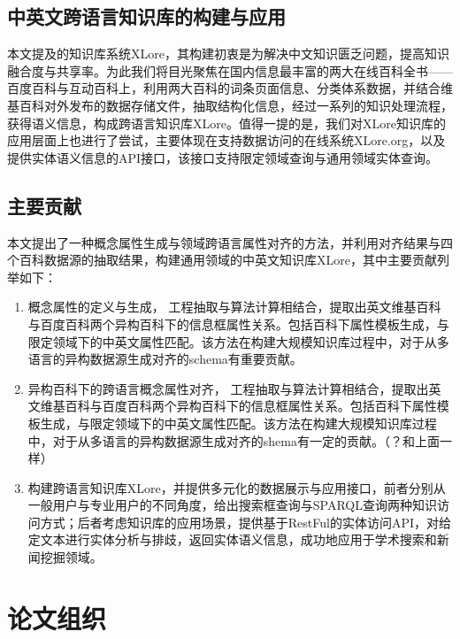 
\subsection{中英文跨语言知识库的构建与应用}
本文提及的知识库系统XLore，其构建初衷是为解决中文知识匮乏问题，提高知识融合度与共享率。为此我们将目光聚焦在国内信息最丰富的两大在线百科全书——百度百科与互动百科上，利用两大百科的词条页面信息、分类体系数据，并结合维基百科对外发布的数据存储文件，抽取结构化信息，经过一系列的知识处理流程，获得语义信息，构成跨语言知识库XLore。值得一提的是，我们对XLore知识库的应用层面上也进行了尝试，主要体现在支持数据访问的在线系统XLore.org，以及提供实体语义信息的API接口，该接口支持限定领域查询与通用领域实体查询。

\subsection{主要贡献}
本文提出了一种概念属性生成与领域跨语言属性对齐的方法，并利用对齐结果与四个百科数据源的抽取结果，构建通用领域的中英文知识库XLore，其中主要贡献列举如下：
\begin{enumerate}[1)]
\item {\heiti 概念属性的定义与生成，} 工程抽取与算法计算相结合，提取出英文维基百科与百度百科两个异构百科下的信息框属性关系。包括百科下属性模板生成，与限定领域下的中英文属性匹配。该方法在构建大规模知识库过程中，对于从多语言的异构数据源生成对齐的schema有重要贡献。
\item {\heiti 异构百科下的跨语言概念属性对齐，} 工程抽取与算法计算相结合，提取出英文维基百科与百度百科两个异构百科下的信息框属性关系。包括百科下属性模板生成，与限定领域下的中英文属性匹配。该方法在构建大规模知识库过程中，对于从多语言的异构数据源生成对齐的shema有一定的贡献。（？和上面一样）
\item {\heiti 构建跨语言知识库XLore，并提供多元化的数据展示与应用接口，}前者分别从一般用户与专业用户的不同角度，给出搜索框查询与SPARQL查询两种知识访问方式；后者考虑知识库的应用场景，提供基于RestFul的实体访问API，对给定文本进行实体分析与排歧，返回实体语义信息，成功地应用于学术搜索和新闻挖掘领域。
\end{enumerate}

\section{论文组织}

